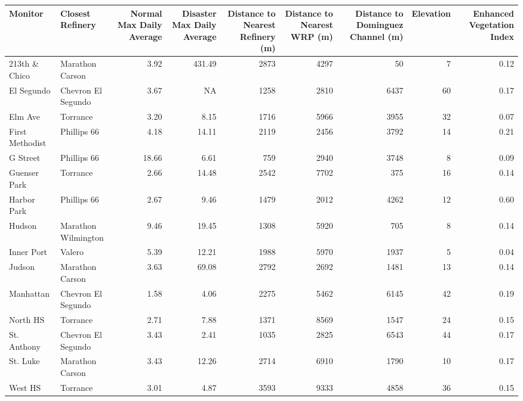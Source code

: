 
\begin{tabular}{l|l|r|r|r|r|r|r|r}
\hline
Monitor & Closest Refinery & Normal Max Daily Average & Disaster Max Daily Average & Distance to Nearest Refinery (m) & Distance to Nearest WRP (m) & Distance to Dominguez Channel (m) & Elevation & Enhanced Vegetation Index\\
\hline
213th \& Chico & Marathon Carson & 3.92 & 431.49 & 2873 & 4297 & 50 & 7 & 0.12\\
\hline
El Segundo & Chevron El Segundo & 3.67 & NA & 1258 & 2810 & 6437 & 60 & 0.17\\
\hline
Elm Ave & Torrance & 3.20 & 8.15 & 1716 & 5966 & 3955 & 32 & 0.07\\
\hline
First Methodist & Phillips 66 & 4.18 & 14.11 & 2119 & 2456 & 3792 & 14 & 0.21\\
\hline
G Street & Phillips 66 & 18.66 & 6.61 & 759 & 2940 & 3748 & 8 & 0.09\\
\hline
Guenser Park & Torrance & 2.66 & 14.48 & 2542 & 7702 & 375 & 16 & 0.14\\
\hline
Harbor Park & Phillips 66 & 2.67 & 9.46 & 1479 & 2012 & 4262 & 12 & 0.60\\
\hline
Hudson & Marathon Wilmington & 9.46 & 19.45 & 1308 & 5920 & 705 & 8 & 0.14\\
\hline
Inner Port & Valero & 5.39 & 12.21 & 1988 & 5970 & 1937 & 5 & 0.04\\
\hline
Judson & Marathon Carson & 3.63 & 69.08 & 2792 & 2692 & 1481 & 13 & 0.14\\
\hline
Manhattan & Chevron El Segundo & 1.58 & 4.06 & 2275 & 5462 & 6145 & 42 & 0.19\\
\hline
North HS & Torrance & 2.71 & 7.88 & 1371 & 8569 & 1547 & 24 & 0.15\\
\hline
St. Anthony & Chevron El Segundo & 3.43 & 2.41 & 1035 & 2825 & 6543 & 44 & 0.17\\
\hline
St. Luke & Marathon Carson & 3.43 & 12.26 & 2714 & 6910 & 1790 & 10 & 0.17\\
\hline
West HS & Torrance & 3.01 & 4.87 & 3593 & 9333 & 4858 & 36 & 0.15\\
\hline
\end{tabular}
